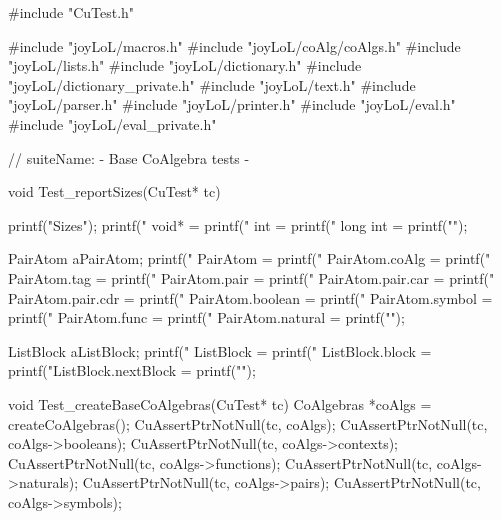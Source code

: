 #include "CuTest.h"

#include "joyLoL/macros.h"
#include "joyLoL/coAlg/coAlgs.h"
#include "joyLoL/lists.h"
#include "joyLoL/dictionary.h"
#include "joyLoL/dictionary_private.h"
#include "joyLoL/text.h"
#include "joyLoL/parser.h"
#include "joyLoL/printer.h"
#include "joyLoL/eval.h"
#include "joyLoL/eval_private.h"

// suiteName: - Base CoAlgebra tests -

void Test_reportSizes(CuTest* tc) {
  printf("\nStructure Sizes\n");
  printf("              void* = %
  printf("                int = %
  printf("           long int = %
  printf("\n");

  PairAtom aPairAtom;
  printf("           PairAtom = %
  printf("     PairAtom.coAlg = %
  printf("       PairAtom.tag = %
  printf("      PairAtom.pair = %
  printf("  PairAtom.pair.car = %
  printf("  PairAtom.pair.cdr = %
  printf("   PairAtom.boolean = %
  printf("    PairAtom.symbol = %
  printf("      PairAtom.func = %
  printf("   PairAtom.natural = %
  printf("\n");

  ListBlock aListBlock;
  printf("          ListBlock = %
  printf("    ListBlock.block = %
  printf("ListBlock.nextBlock = %
  printf("\n");
}

void Test_createBaseCoAlgebras(CuTest* tc) {
  CoAlgebras *coAlgs = createCoAlgebras();
  CuAssertPtrNotNull(tc, coAlgs);
  CuAssertPtrNotNull(tc, coAlgs->booleans);
  CuAssertPtrNotNull(tc, coAlgs->contexts);
  CuAssertPtrNotNull(tc, coAlgs->functions);
  CuAssertPtrNotNull(tc, coAlgs->naturals);
  CuAssertPtrNotNull(tc, coAlgs->pairs);
  CuAssertPtrNotNull(tc, coAlgs->symbols);
}
\stoptyping




